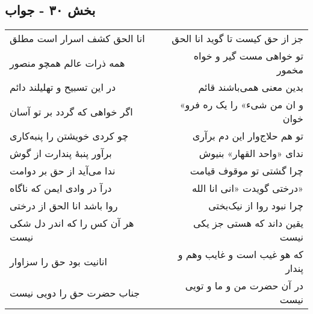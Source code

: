 \begin{center}
\section*{بخش ۳۰ - جواب}
\label{sec:sh030}
\begin{longtable}{l p{0.5cm} r}
انا الحق کشف اسرار است مطلق
&&
جز از حق کیست تا گوید انا الحق
\\
همه ذرات عالم همچو منصور
&&
تو خواهی مست گیر و خواه مخمور
\\
در این تسبیح و تهلیلند دائم
&&
بدین معنی همی‌باشند قائم
\\
اگر خواهی که گردد بر تو آسان
&&
«و ان من شیء» را یک ره فرو خوان
\\
چو کردی خویشتن را پنبه‌کاری
&&
تو هم حلاج‌وار این دم برآری
\\
برآور پنبهٔ پندارت از گوش
&&
ندای «واحد القهار» بنیوش
\\
ندا می‌آید از حق بر دوامت
&&
چرا گشتی تو موقوف قیامت
\\
درآ در وادی ایمن که ناگاه
&&
درختی گویدت «انی انا الله»
\\
روا باشد انا الحق از درختی
&&
چرا نبود روا از نیک‌بختی
\\
هر آن کس را که اندر دل شکی نیست
&&
یقین داند که هستی جز یکی نیست
\\
انانیت بود حق را سزاوار
&&
که هو غیب است و غایب وهم و پندار
\\
جناب حضرت حق را دویی نیست
&&
در آن حضرت من و ما و تویی نیست
\\
\end{longtable}
\end{center}

